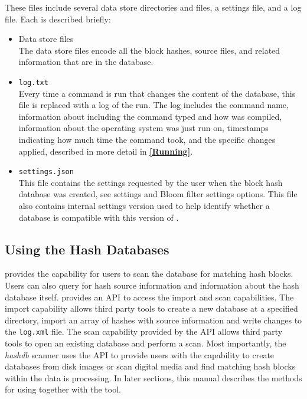 \documentclass[11pt,fleqn]{article} %
\begin{document}
These files include several data store directories and files, a settings file, and a log file.
Each is described briefly:

\begin{itemize}
\item Data store files \\
The data store files encode all the block hashes, source files, and related information that are in the database.


\item \texttt{log.txt} \\
Every time a command is run that changes the content of the database, this file is replaced with a log of the run.
The log includes the command name, information about \hdb including the command typed and how \hdb was compiled, information about the operating system \hdb was just run on, timestamps indicating how much time the command took, and the specific \hdb changes applied, described in more detail in \textbf{\autoref{Running}}.
\item \texttt{settings.json} \\
This file contains the settings requested by the user when the block hash database was created, see \hdb settings and Bloom filter settings options.
This file also contains internal \hdb settings version used to help \hdb identify whether a database is compatible with this version of \hdb.
\end{itemize}




\subsection{Using the Hash Databases}
\label{usingSection}
\hdb provides the capability for users to scan the database for matching hash blocks. Users can also query for hash source information and information about the hash database itself. \hdb provides an API to access the import and scan capabilities.  The import capability allows third party tools to create a new database at a specified directory, import an array of hashes with source information and write changes to the \texttt{log.xml} file. The scan capability provided by the API allows third party tools to open an existing database and perform a scan. Most importantly, the \bulk \textit{hashdb} scanner uses the \hdb API to provide users with the capability to create databases from disk images or scan digital media and find matching hash blocks within the data \bulk is processing. In later sections, this manual describes the methods for using \bulk together with the \hdb tool. 
\end{document}

